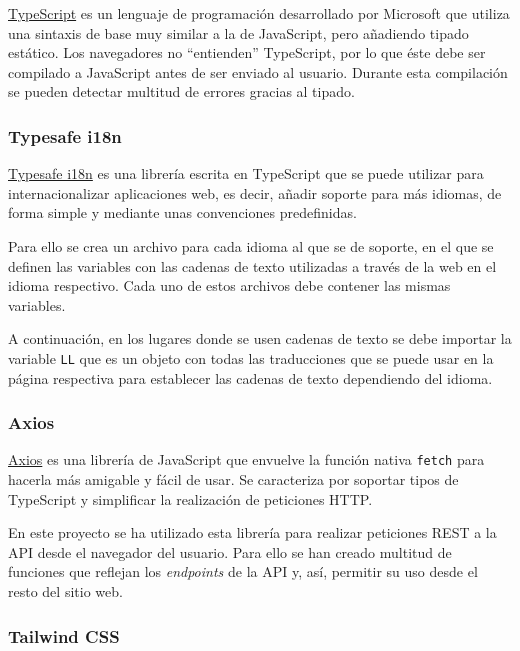 \href{https://www.typescriptlang.org/}{TypeScript} es un lenguaje de
programación desarrollado por Microsoft que utiliza una sintaxis de base muy
similar a la de JavaScript, pero añadiendo tipado estático. Los navegadores no
``entienden'' TypeScript, por lo que éste debe ser compilado a JavaScript antes
de ser enviado al usuario. Durante esta compilación se pueden detectar multitud
de errores gracias al tipado.

\subsubsection{Typesafe i18n}

\href{https://github.com/ivanhofer/typesafe-i18n}{Typesafe i18n} es una librería
escrita en TypeScript que se puede utilizar para internacionalizar aplicaciones
web, es decir, añadir soporte para más idiomas, de forma simple y mediante unas
convenciones predefinidas.

Para ello se crea un archivo para cada idioma al que se de soporte, en el que se
definen las variables con las cadenas de texto utilizadas a través de la web en
el idioma respectivo. Cada uno de estos archivos debe contener las mismas
variables.

A continuación, en los lugares donde se usen cadenas de texto se debe importar la
variable \texttt{LL} que es un objeto con todas las traducciones que se puede
usar en la página respectiva para establecer las cadenas de texto dependiendo
del idioma.

\subsubsection{Axios}

\href{https://github.com/axios/axios}{Axios} es una librería de JavaScript que
envuelve la función nativa \texttt{fetch} para hacerla más amigable y fácil de
usar. Se caracteriza por soportar tipos de TypeScript y simplificar la
realización de peticiones HTTP.

En este proyecto se ha utilizado esta librería para realizar peticiones REST a
la API desde el navegador del usuario. Para ello se han creado multitud de
funciones que reflejan los \textit{endpoints} de la API y, así, permitir su uso
desde el resto del sitio web.

\subsubsection{Tailwind CSS}

